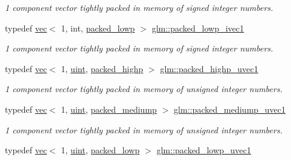 \begin{DoxyCompactItemize}
\begin{DoxyCompactList}\small\item\em 1 component vector tightly packed in memory of signed integer numbers. \end{DoxyCompactList}\item 
typedef \mbox{\hyperlink{structglm_1_1vec}{vec}}$<$ 1, int, \mbox{\hyperlink{namespaceglm_a36ed105b07c7746804d7fdc7cc90ff25ac36a4bd74559be2c0b65bc48e5953b8b}{packed\+\_\+lowp}} $>$ \mbox{\hyperlink{group__gtc__type__aligned_ga259a03c1d585f918f04230dde51cc95a}{glm\+::packed\+\_\+lowp\+\_\+ivec1}}
\begin{DoxyCompactList}\small\item\em 1 component vector tightly packed in memory of signed integer numbers. \end{DoxyCompactList}\item 
typedef \mbox{\hyperlink{structglm_1_1vec}{vec}}$<$ 1, \mbox{\hyperlink{group__core__precision_ga4fd29415871152bfb5abd588334147c8}{uint}}, \mbox{\hyperlink{namespaceglm_a36ed105b07c7746804d7fdc7cc90ff25a8e8791ee77fe079b1291f710d88031bf}{packed\+\_\+highp}} $>$ \mbox{\hyperlink{group__gtc__type__aligned_ga160352f526bef94d143ccb525095936e}{glm\+::packed\+\_\+highp\+\_\+uvec1}}
\begin{DoxyCompactList}\small\item\em 1 component vector tightly packed in memory of unsigned integer numbers. \end{DoxyCompactList}\item 
typedef \mbox{\hyperlink{structglm_1_1vec}{vec}}$<$ 1, \mbox{\hyperlink{group__core__precision_ga4fd29415871152bfb5abd588334147c8}{uint}}, \mbox{\hyperlink{namespaceglm_a36ed105b07c7746804d7fdc7cc90ff25a9604654c3b137cd7898689fd34b25bc0}{packed\+\_\+mediump}} $>$ \mbox{\hyperlink{group__gtc__type__aligned_ga2fd382e54fcf213b330d448f83738636}{glm\+::packed\+\_\+mediump\+\_\+uvec1}}
\begin{DoxyCompactList}\small\item\em 1 component vector tightly packed in memory of unsigned integer numbers. \end{DoxyCompactList}\item 
typedef \mbox{\hyperlink{structglm_1_1vec}{vec}}$<$ 1, \mbox{\hyperlink{group__core__precision_ga4fd29415871152bfb5abd588334147c8}{uint}}, \mbox{\hyperlink{namespaceglm_a36ed105b07c7746804d7fdc7cc90ff25ac36a4bd74559be2c0b65bc48e5953b8b}{packed\+\_\+lowp}} $>$ \mbox{\hyperlink{group__gtc__type__aligned_ga992b281fc2e3bf15c09f491393045ebc}{glm\+::packed\+\_\+lowp\+\_\+uvec1}}

\end{DoxyCompactItemize}
